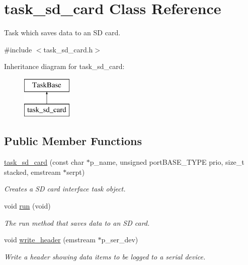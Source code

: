 \hypertarget{classtask__sd__card}{\section{task\-\_\-sd\-\_\-card Class Reference}
\label{classtask__sd__card}
}


Task which saves data to an S\-D card.  




{\ttfamily \#include $<$task\-\_\-sd\-\_\-card.\-h$>$}

Inheritance diagram for task\-\_\-sd\-\_\-card\-:\begin{figure}[H]
\begin{center}
\leavevmode
\includegraphics[height=2.000000cm]{classtask__sd__card}
\end{center}
\end{figure}
\subsection*{Public Member Functions}
\begin{DoxyCompactItemize}
\item 
\hyperlink{classtask__sd__card_a7947744fb5282ee4c2fddfeb7c40b822}{task\-\_\-sd\-\_\-card} (const char $\ast$p\-\_\-name, unsigned port\-B\-A\-S\-E\-\_\-\-T\-Y\-P\-E prio, size\-\_\-t stacked, emstream $\ast$serpt)
\begin{DoxyCompactList}\small\item\em Creates a S\-D card interface task object. \end{DoxyCompactList}\item 
void \hyperlink{classtask__sd__card_abcc6f28563aefe867e3ed0da77f5ddbe}{run} (void)
\begin{DoxyCompactList}\small\item\em The run method that saves data to an S\-D card. \end{DoxyCompactList}\item 
void \hyperlink{classtask__sd__card_a36f6f877f8359c84ff1a63ce8b505783}{write\-\_\-header} (emstream $\ast$p\-\_\-ser\-\_\-dev)
\begin{DoxyCompactList}\small\item\em Write a header showing data items to be logged to a serial device. \end{DoxyCompactList}\end{DoxyCompactItemize}


